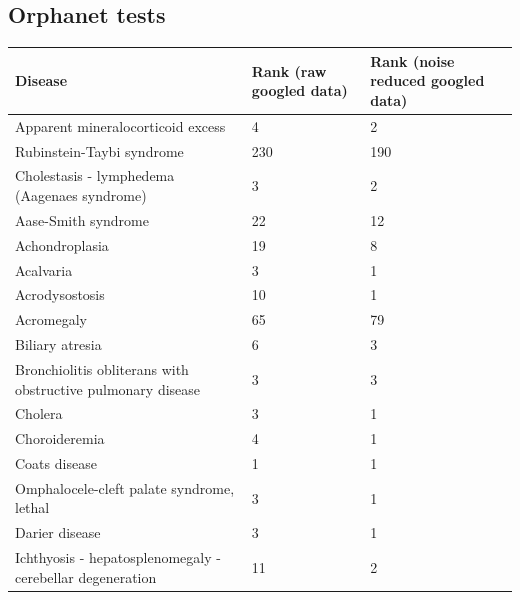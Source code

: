 \documentclass[10pt,letterpaper,final]{article}
\begin{document}
\subsection{Orphanet tests}
\begin{center}
\begin{small}
	\begin{tabular}{|p{3.5cm}|p{1.8cm}|p{1.8cm}|}
	\hline
	\textbf{Disease}  & \textbf{Rank (raw googled data)} & \textbf{Rank (noise reduced googled data)} \\
    \hline\hline
    Apparent mineralocorticoid excess & 4 & 2\\    \hline
    Rubinstein-Taybi syndrome  & 230 & 190\\    \hline
    Cholestasis - lymphedema  (Aagenaes syndrome) & 3 & 2\\    \hline
    Aase-Smith syndrome  & 22 & 12\\    \hline
    Achondroplasia  & 19 & 8\\    \hline
    Acalvaria    & 3 & 1\\    \hline
    Acrodysostosis  & 10 & 1\\    \hline
    Acromegaly & 65 & 79\\    \hline
    Biliary atresia  & 6 & 3\\    \hline
    Bronchiolitis obliterans with obstructive pulmonary disease  & 3 & 3\\    \hline
    Cholera  & 3 & 1\\    \hline
    Choroideremia  & 4 & 1\\    \hline
    Coats disease  & 1 & 1\\    \hline
    Omphalocele-cleft palate syndrome, lethal  & 3 & 1\\    \hline
    Darier disease  & 3 & 1\\    \hline
    Ichthyosis - hepatosplenomegaly - cerebellar degeneration  & 11 & 2\\    \hline
    \end{tabular}
\label{tab:results_orphanet}
\end{small}
\end{center}
\end{document}
